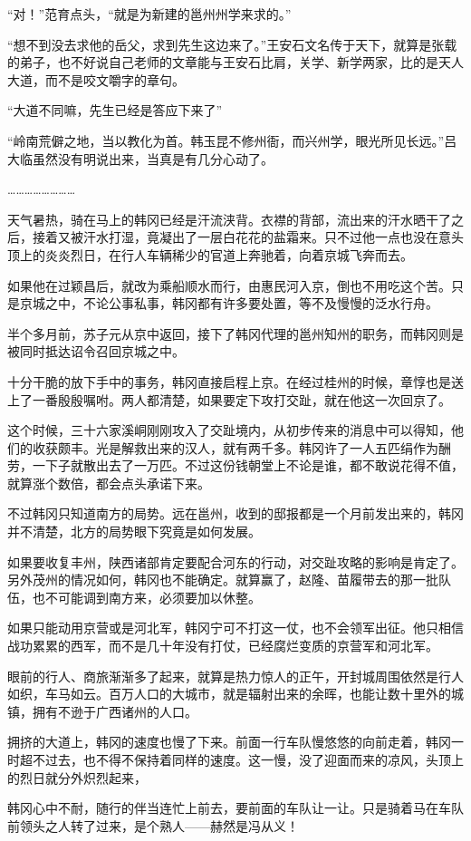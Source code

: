 “对！”范育点头，“就是为新建的邕州州学来求的。”

“想不到没去求他的岳父，求到先生这边来了。”王安石文名传于天下，就算是张载的弟子，也不好说自己老师的文章能与王安石比肩，关学、新学两家，比的是天人大道，而不是咬文嚼字的章句。

“大道不同嘛，先生已经是答应下来了”

“岭南荒僻之地，当以教化为首。韩玉昆不修州衙，而兴州学，眼光所见长远。”吕大临虽然没有明说出来，当真是有几分心动了。

……………………

天气暑热，骑在马上的韩冈已经是汗流浃背。衣襟的背部，流出来的汗水晒干了之后，接着又被汗水打湿，竟凝出了一层白花花的盐霜来。只不过他一点也没在意头顶上的炎炎烈日，在行人车辆稀少的官道上奔驰着，向着京城飞奔而去。

如果他在过颖昌后，就改为乘船顺水而行，由惠民河入京，倒也不用吃这个苦。只是京城之中，不论公事私事，韩冈都有许多要处置，等不及慢慢的泛水行舟。

半个多月前，苏子元从京中返回，接下了韩冈代理的邕州知州的职务，而韩冈则是被同时抵达诏令召回京城之中。

十分干脆的放下手中的事务，韩冈直接启程上京。在经过桂州的时候，章惇也是送上了一番殷殷嘱咐。两人都清楚，如果要定下攻打交趾，就在他这一次回京了。

这个时候，三十六家溪峒刚刚攻入了交趾境内，从初步传来的消息中可以得知，他们的收获颇丰。光是解救出来的汉人，就有两千多。韩冈许了一人五匹绢作为酬劳，一下子就散出去了一万匹。不过这份钱朝堂上不论是谁，都不敢说花得不值，就算涨个数倍，都会点头承诺下来。

不过韩冈只知道南方的局势。远在邕州，收到的邸报都是一个月前发出来的，韩冈并不清楚，北方的局势眼下究竟是如何发展。

如果要收复丰州，陕西诸部肯定要配合河东的行动，对交趾攻略的影响是肯定了。另外茂州的情况如何，韩冈也不能确定。就算赢了，赵隆、苗履带去的那一批队伍，也不可能调到南方来，必须要加以休整。

如果只能动用京营或是河北军，韩冈宁可不打这一仗，也不会领军出征。他只相信战功累累的西军，而不是几十年没有打仗，已经腐烂变质的京营军和河北军。

眼前的行人、商旅渐渐多了起来，就算是热力惊人的正午，开封城周围依然是行人如织，车马如云。百万人口的大城市，就是辐射出来的余晖，也能让数十里外的城镇，拥有不逊于广西诸州的人口。

拥挤的大道上，韩冈的速度也慢了下来。前面一行车队慢悠悠的向前走着，韩冈一时超不过去，也不得不保持着同样的速度。这一慢，没了迎面而来的凉风，头顶上的烈日就分外炽烈起来，

韩冈心中不耐，随行的伴当连忙上前去，要前面的车队让一让。只是骑着马在车队前领头之人转了过来，是个熟人——赫然是冯从义！

